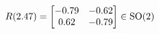 \documentclass[preview]{standalone}
\begin{document}
\begin{align*}
\special{dvisvgm:raw <g id='unique000'>}R(2.47) = \begin{bmatrix} -0.79 & -0.62 \\ 0.62 & -0.79 \end{bmatrix} \in \text{SO}(2)\special{dvisvgm:raw </g>}
\end{align*}
\end{document}
